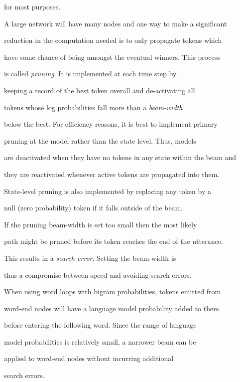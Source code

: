 for most purposes.





A large network will have many nodes and one way to make a significant


reduction in the computation needed is to only propagate tokens which


have some chance of being amongst the eventual winners.  This process


is called \textit{pruning}.  It is implemented at each time step by


keeping a record of the best token overall and de-activating all


tokens whose log probabilities fall more than a \textit{beam-width}


below the best.  For efficiency reasons, it is best to implement primary


pruning at the model rather than the state level.  Thus, models


are deactivated when they have no tokens in any state within the beam and


they are reactivated whenever active tokens are propagated into them.


State-level pruning is also implemented by replacing any token by a 


null (zero probability) token if it falls outside of the beam.


If the pruning beam-width is set too small then the most likely


path might be pruned before its token reaches the end of the utterance.


This results in a \textit{search error}.  Setting the beam-width is


thus a compromise between speed and avoiding search errors.





When using word loops with bigram probabilities, tokens emitted from


word-end nodes will have a language model probability added to them


before entering the following word.  Since the range of language


model probabilities is relatively small, a narrower beam can be


applied to word-end nodes without incurring additional 


search errors.


